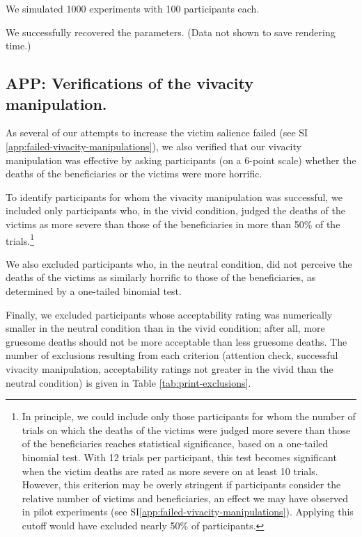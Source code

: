 \documentclass[
]{article}
\begin{document}
We simulated 1000 experiments with 100 participants each.

We successfully recovered the parameters. (Data not shown to save rendering time.)

\clearpage

\subsection{APP: Verifications of the vivacity manipulation.}\label{app:vivacity-verifications}

As several of our attempts to increase the victim salience failed (see SI \ref{app:failed-vivacity-manipulations}), we also verified that our vivacity manipulation was effective by asking participants (on a 6-point scale) whether the deaths of the beneficiaries or the victims were more horrific.

To identify participants for whom the vivacity manipulation was successful, we included only participants who, in the vivid condition, judged the deaths of the victims as more severe than those of the beneficiaries in more than 50\% of the trials.\footnote{In principle, we could include only those participants for whom the number of trials on which the deaths of the victims were judged more severe than those of the beneficiaries reaches statistical significance, based on a one-tailed binomial test. With 12 trials per participant, this test becomes significant when the victim deaths are rated as more severe on at least 10 trials. However, this criterion may be overly stringent if participants consider the relative number of victims and beneficiaries, an effect we may have observed in pilot experiments (see SI\ref{app:failed-vivacity-manipulations}). Applying this cutoff would have excluded nearly 50\% of participants.}

We also excluded participants who, in the neutral condition, did not perceive the deaths of the victims as similarly horrific to those of the beneficiaries, as determined by a one-tailed binomial test.

Finally, we excluded participants whose acceptability rating was numerically smaller in the neutral condition than in the vivid condition; after all, more gruesome deaths should not be more acceptable than less gruesome deaths. The number of exclusions resulting from each criterion (attention check, successful vivacity manipulation, acceptability ratings not greater in the vivid than the neutral condition) is given in Table \ref{tab:print-exclusions}.
\end{document}
